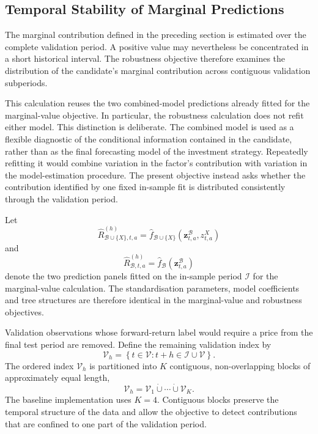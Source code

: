 \subsection{Temporal Stability of Marginal Predictions}
\label{subsec:blocked_marginal_stability}

The marginal contribution defined in the preceding section is estimated over the
complete validation period. A positive value may nevertheless be concentrated in
a short historical interval. The robustness objective therefore examines the
distribution of the candidate's marginal contribution across contiguous validation
subperiods.

This calculation reuses the two combined-model predictions already fitted for
the marginal-value objective. In particular, the robustness calculation does not
refit either model. This distinction is deliberate. The combined model is used as
a flexible diagnostic of the conditional information contained in the candidate,
rather than as the final forecasting model of the investment strategy. Repeatedly
refitting it would combine variation in the factor's contribution with variation
in the model-estimation procedure. The present objective instead asks whether the
contribution identified by one fixed in-sample fit is distributed consistently
through the validation period.

Let
\[
    \widehat R^{(h)}_{\mathcal B\cup\{X\},t,a}
    =
    \widehat f_{\mathcal B\cup\{X\}}
    \left(
        \mathbf z^{\mathcal B}_{t,a},z^X_{t,a}
    \right)
\]
and
\[
    \widehat R^{(h)}_{\mathcal B,t,a}
    =
    \widehat f_{\mathcal B}
    \left(
        \mathbf z^{\mathcal B}_{t,a}
    \right)
\]
denote the two prediction panels fitted on the in-sample period \(\mathcal I\)
for the marginal-value calculation. The standardisation parameters, model
coefficients and tree structures are therefore identical in the marginal-value
and robustness objectives.

Validation observations whose forward-return label would require a price from the
final test period are removed. Define the remaining validation index by
\[
    \mathcal V_h
    =
    \left\{
        t\in\mathcal V:t+h\in\mathcal I\cup\mathcal V
    \right\}.
\]
The ordered index \(\mathcal V_h\) is partitioned into \(K\) contiguous,
non-overlapping blocks of approximately equal length,
\[
    \mathcal V_h
    =
    \mathcal V_1\mathbin{\dot\cup}\cdots
    \mathbin{\dot\cup}\mathcal V_K.
\]
The baseline implementation uses \(K=4\). Contiguous blocks preserve the
temporal structure of the data and allow the objective to detect contributions
that are confined to one part of the validation period.

